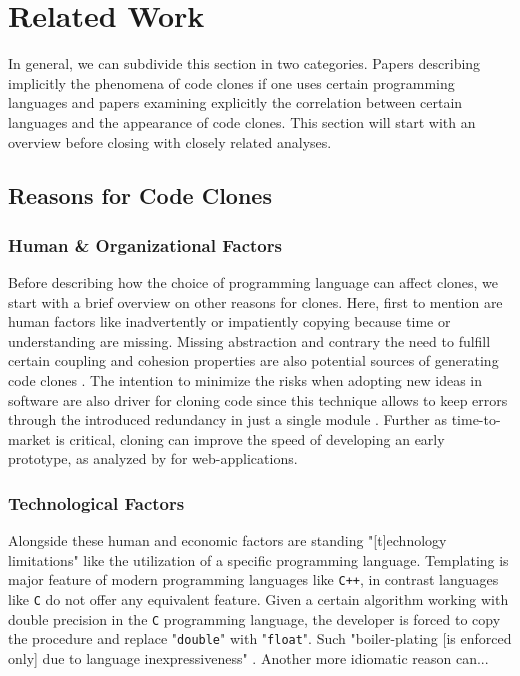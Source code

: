 
\section{Related Work}
\label{sec:related_work}

In general, we can subdivide this section in two categories. Papers describing implicitly the phenomena of code clones if one uses certain programming languages and papers examining explicitly the correlation between certain languages and the appearance of code clones. This section will start with an overview before closing with closely related analyses.

\subsection{Reasons for Code Clones}

\subsubsection{Human \& Organizational Factors}

Before describing how the choice of programming language can affect clones, we start with a brief overview on other reasons for clones. Here, first to mention are human factors like inadvertently or impatiently copying because time or understanding are missing. Missing abstraction and contrary the need to fulfill certain coupling and cohesion properties are also potential sources of generating code clones \cite{kasper2006cloning}.
The intention to minimize the risks when adopting new ideas in software are also driver for cloning code since this technique allows to keep errors through the introduced redundancy in just a single module \cite{cordy2003comprehending}. Further as time-to-market is critical, cloning can improve the speed of developing an early prototype, as analyzed by \cite{rajapakse2007using} for web-applications.

\subsubsection{Technological Factors}

Alongside these human and economic factors are standing "[t]echnology limitations" \cite{kasper2006cloning} like the utilization of a specific programming language.
Templating is major feature of modern programming languages like \texttt{C++}, in contrast languages like \texttt{C} do not offer any equivalent feature. Given a certain algorithm working with double precision in the \texttt{C} programming language, the developer is forced to copy the procedure and replace "\texttt{double}" with "\texttt{float}". Such "boiler-plating [is enforced only] due to language inexpressiveness" \cite{kasper2006cloning}.
Another more idiomatic reason can...

